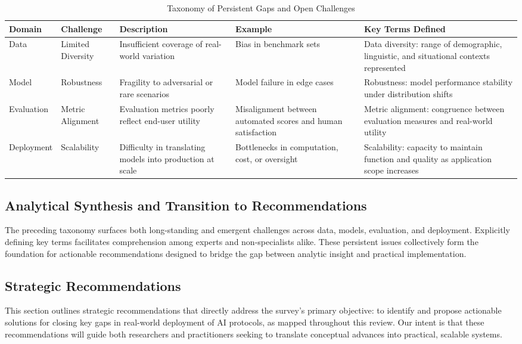 \documentclass[sigconf]{acmart}
\begin{document}
\begin{table*}[htbp]
\centering
\caption{Taxonomy of Persistent Gaps and Open Challenges}
\label{tab:taxonomy-gaps}
\begin{adjustbox}{max width=\textwidth}
\begin{tabular}{@{}lllll@{}}
\toprule
Domain & Challenge & Description & Example & Key Terms Defined \\
\midrule
Data & Limited Diversity & Insufficient coverage of real-world variation & Bias in benchmark sets & Data diversity: range of demographic, linguistic, and situational contexts represented \\
Model & Robustness & Fragility to adversarial or rare scenarios & Model failure in edge cases & Robustness: model performance stability under distribution shifts \\
Evaluation & Metric Alignment & Evaluation metrics poorly reflect end-user utility & Misalignment between automated scores and human satisfaction & Metric alignment: congruence between evaluation measures and real-world utility \\
Deployment & Scalability & Difficulty in translating models into production at scale & Bottlenecks in computation, cost, or oversight & Scalability: capacity to maintain function and quality as application scope increases \\
\bottomrule
\end{tabular}
\end{adjustbox}
\end{table*}

\subsection{Analytical Synthesis and Transition to Recommendations}

The preceding taxonomy surfaces both long-standing and emergent challenges across data, models, evaluation, and deployment. Explicitly defining key terms facilitates comprehension among experts and non-specialists alike. These persistent issues collectively form the foundation for actionable recommendations designed to bridge the gap between analytic insight and practical implementation.

\subsection{Strategic Recommendations}

This section outlines strategic recommendations that directly address the survey's primary objective: to identify and propose actionable solutions for closing key gaps in real-world deployment of AI protocols, as mapped throughout this review. Our intent is that these recommendations will guide both researchers and practitioners seeking to translate conceptual advances into practical, scalable systems.
\end{document}
